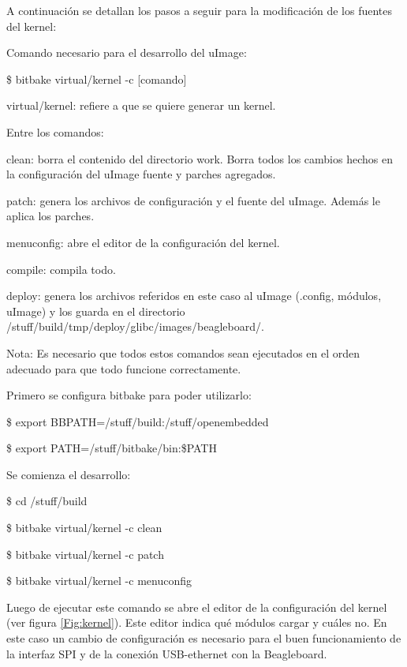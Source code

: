 \bigskip
A continuación se detallan los pasos a seguir para la modificación de los fuentes del kernel:
 
\bigskip 
Comando necesario para el desarrollo del uImage:

\bigskip
\centerline{\$ bitbake virtual/kernel -c [comando]}

\bigskip
virtual/kernel: refiere a que se quiere generar un kernel.

\newpage
Entre los comandos:

\bigskip
clean: borra el contenido del directorio work. Borra todos los cambios hechos en la configuración del uImage fuente y parches agregados.

patch: genera los archivos de configuración y el fuente del uImage. Además le aplica los parches.

menuconfig: abre el editor de la configuración del kernel.

compile: compila todo.

deploy: genera los archivos referidos en este caso al uImage (.config, módulos, uImage) y los guarda en el directorio /stuff/build/tmp/deploy/glibc/images/beagleboard/.

\bigskip
Nota: Es necesario que todos estos comandos sean ejecutados en el orden adecuado para que todo funcione correctamente.

\bigskip
Primero se configura bitbake para poder utilizarlo:

\centerline{\$ export BBPATH=/stuff/build:/stuff/openembedded}

\centerline{\$ export PATH=/stuff/bitbake/bin:\$PATH}

\bigskip
Se comienza el desarrollo:

\centerline{\$ cd /stuff/build}

\centerline{\$ bitbake virtual/kernel -c clean}

\centerline{\$ bitbake virtual/kernel -c patch}

\centerline{\$ bitbake virtual/kernel -c menuconfig}

\bigskip
Luego de ejecutar este comando se abre el editor de la configuración del kernel (ver figura \ref{Fig:kernel}). Este editor indica qué módulos cargar y cuáles no. En este caso un cambio de  configuración es necesario para el buen funcionamiento de la interfaz SPI y de la conexión USB-ethernet con la Beagleboard.

